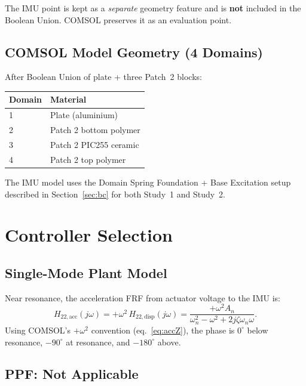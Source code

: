 \documentclass[12pt,a4paper]{article}
\begin{document}
The IMU point is kept as a \emph{separate} geometry feature and is \textbf{not}
included in the Boolean Union.  COMSOL preserves it as an evaluation point.

\subsection{COMSOL Model Geometry (4 Domains)}

After Boolean Union of plate + three Patch~2 blocks:
\begin{center}
\begin{tabular}{ll}
\toprule
Domain & Material \\
\midrule
1 & Plate (aluminium) \\
2 & Patch 2 bottom polymer \\
3 & Patch 2 PIC255 ceramic \\
4 & Patch 2 top polymer \\
\bottomrule
\end{tabular}
\end{center}

The IMU model uses the Domain Spring Foundation + Base Excitation setup described
in Section~\ref{sec:bc} for both Study~1 and Study~2.

\section{Controller Selection}
\label{sec:select}

\subsection{Single-Mode Plant Model}

Near resonance, the acceleration FRF from actuator voltage to the IMU is:
\begin{equation}
  H_{22,\text{acc}}(j\omega) = +\omega^2\,H_{22,\text{disp}}(j\omega)
  = \frac{+\omega^2 A_n}{\omega_n^2 - \omega^2 + 2j\zeta\omega_n\omega}.
  \label{eq:H22acc}
\end{equation}
Using COMSOL's $+\omega^2$ convention (eq.~\eqref{eq:accZ}), the phase is
$0^\circ$ below resonance, $-90^\circ$ at resonance, and $-180^\circ$ above.

\subsection{PPF: Not Applicable}
\label{sec:ppf_reject}
\end{document}
